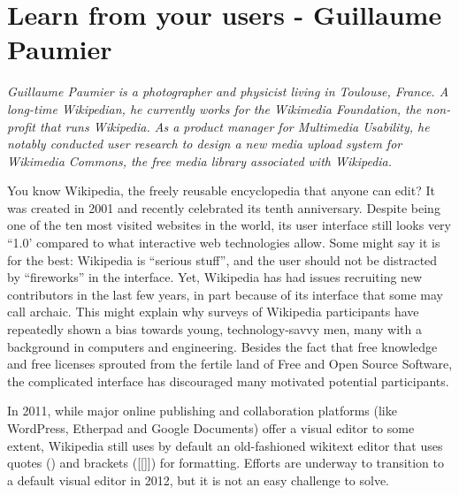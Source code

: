 \chapter{Learn from your users - Guillaume Paumier}


\textit{Guillaume Paumier is a photographer and physicist living in Toulouse,
France. A long-time Wikipedian, he currently works for the Wikimedia
Foundation, the non-profit that runs Wikipedia. As a product manager for
Multimedia Usability, he notably conducted user research to design a new media
upload system for Wikimedia Commons, the free media library associated with
Wikipedia.}

You know Wikipedia, the freely reusable encyclopedia that anyone can edit? It
was created in 2001 and recently celebrated its tenth anniversary. Despite being
one of the ten most visited websites in the world, its user interface still
looks very ``1.0' compared to what interactive web technologies allow. Some
might say it is for the best: Wikipedia is ``serious stuff'', and the user
should not be distracted by ``fireworks'' in the interface. Yet, Wikipedia has had
issues recruiting new contributors in the last few years, in part because of its
interface that some may call archaic. This might explain why surveys of
Wikipedia participants have repeatedly shown a bias towards young,
technology-savvy men, many with a background in computers and engineering.
Besides the fact that free knowledge and free licenses sprouted from the fertile
land of Free and Open Source Software, the complicated interface has discouraged
many motivated potential participants.

In 2011, while major online publishing and collaboration platforms (like
WordPress, Etherpad and Google Documents) offer a visual editor to some extent,
Wikipedia still uses by default an old-fashioned wikitext editor that uses
quotes (\textquotesingle \textquotesingle \textquotesingle \textquotesingle) and
brackets ([[]]) for formatting. Efforts are underway to transition to a default
visual editor in 2012, but it is not an easy challenge to solve.

